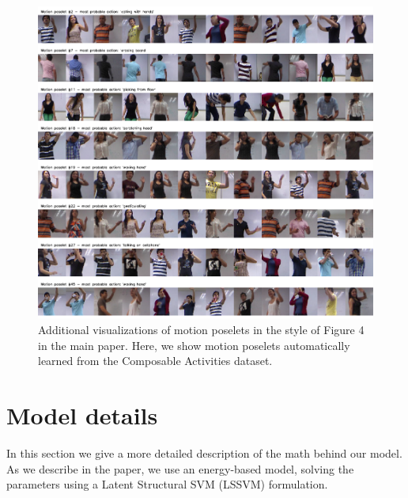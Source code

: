 \documentclass[10pt,letterpaper]{article}
\newcommand{\+}[1]{\ensuremath{{\boldsymbol #1}}}
\begin{document}
\begin{figure}[tb]
\begin{center}
\includegraphics[width=0.999\linewidth]{../Fig/fig_poses_complete.pdf}
\end{center}
\caption{Additional visualizations of motion poselets in the style of Figure 4 in the main paper. Here, we show motion poselets automatically learned from the Composable Activities dataset.  }
\label{fig_poses}
\end{figure}


\section{Model details}

In this section we give a more detailed description of the math behind our model. As we describe in the paper, we use an energy-based model, solving the parameters using a Latent Structural SVM (LSSVM) formulation.
\end{document}
